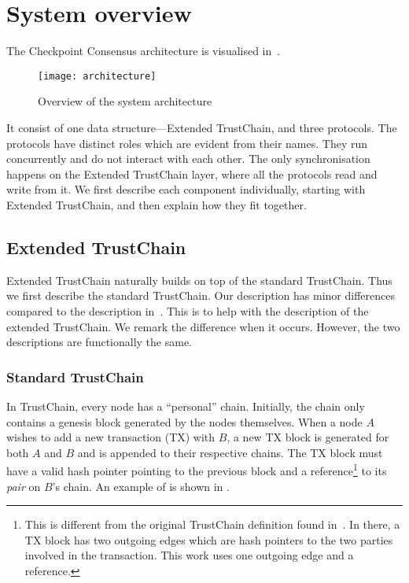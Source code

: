 \section{System overview}
\label{sec:system-overview}
The Checkpoint Consensus architecture is visualised in~.
\begin{figure}[h]
\centering
\texttt{[image: architecture]}
\caption{Overview of the system architecture}
\label{fig:architecture}
\end{figure}
It consist of one data structure---Extended TrustChain, and three protocols.
The protocols have distinct roles which are evident from their names.
They run concurrently and do not interact with each other.
The only synchronisation happens on the Extended TrustChain layer, where all the protocols read and write from it.
We first describe each component individually, starting with Extended TrustChain, and then explain how they fit together.

\subsection{Extended TrustChain}
Extended TrustChain naturally builds on top of the standard TrustChain. 
Thus we first describe the standard TrustChain.
Our description has minor differences compared to the description in~\cite{multichain}.
This is to help with the description of the extended TrustChain.
We remark the difference when it occurs.
However, the two descriptions are functionally the same.

\subsubsection*{Standard TrustChain}
In TrustChain, every node has a ``personal'' chain. 
Initially, the chain only contains a genesis block generated by the nodes themselves.
When a node $A$ wishes to add a new transaction (TX) with $B$,
a new TX block is generated for both $A$ and $B$ and is appended to their respective chains.
The TX block must have a valid hash pointer pointing to the previous block
and a reference\footnote{This is different from the original TrustChain definition found in~\cite{multichain}.
In there, a TX block has two outgoing edges which are hash pointers to the two parties involved in the transaction.
This work uses one outgoing edge and a reference.} to its \emph{pair} on $B$'s chain.
An example of is shown in .

